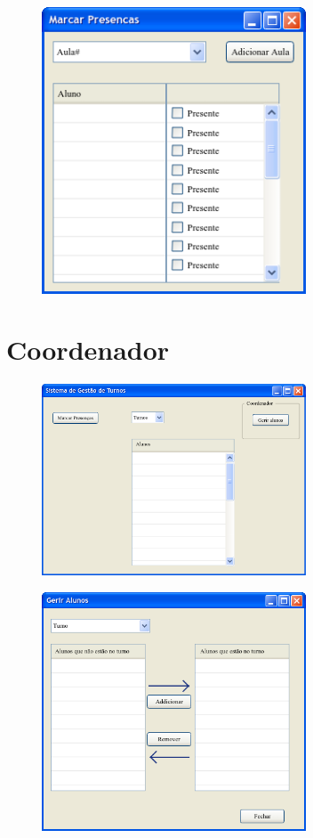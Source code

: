\documentclass[12pt,a4paper]{report}
\begin{document}
\begin{appendices}
\begin{figure}[H]
	\centering 
	\includegraphics[width=0.7\textwidth]{modelacao/mockups/marcarpresencas.png}  
\end{figure}


\section{Coordenador}
\begin{figure}[H]
    \centering
    \includegraphics[width=0.7\textwidth]{modelacao/mockups/coordenador.png}
\end{figure}

\begin{figure}[H]
	\centering 
	\includegraphics[width=0.7\textwidth]{modelacao/mockups/coordenadorgeriralunos.png}  
\end{figure}


\end{appendices}
\end{document}

